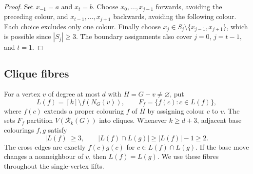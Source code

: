 \documentclass[11pt]{article}
\theoremstyle{remark}
\newcommand{\Rk}{\mathcal R_k}
\numberwithin{equation}{section}
\numberwithin{table}{section}
\begin{document}
\begin{proof}
Set $x_{-1}=a$ and $x_t=b$. Choose $x_0,\ldots,x_{j-1}$ forwards,
avoiding the preceding colour, and $x_{t-1},\ldots,x_{j+1}$
backwards, avoiding the following colour. Each choice excludes only
one colour. Finally choose $x_j\in S_j\setminus\{x_{j-1},x_{j+1}\}$,
which is possible since $|S_j|\ge3$. The boundary assignments also
cover $j=0$, $j=t-1$, and $t=1$.
\end{proof}


\subsection{Clique fibres}
For a vertex $v$ of degree at most $d$ with $H=G-v\ne\varnothing$, put
\[
 L(f)=[k]\setminus f(N_G(v)),\qquad
 F_f=\{f(c):c\in L(f)\},
\]
where $f(c)$ extends a proper colouring $f$ of $H$ by assigning colour
$c$ to $v$. The sets $F_f$ partition $V(\Rk(G))$ into cliques. Whenever
$k\ge d+3$, adjacent base colourings $f,g$ satisfy
\begin{equation}\label{eq:clique-fibres}
 |L(f)|\ge3,\qquad |L(f)\cap L(g)|\ge |L(f)|-1\ge2.
\end{equation}
The cross edges are exactly $f(c)g(c)$ for $c\in L(f)\cap L(g)$.
If the base move changes a nonneighbour of $v$, then $L(f)=L(g)$.
We use these fibres throughout the single-vertex lifts.
\end{document}
